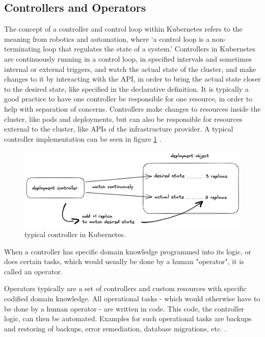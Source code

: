 \subsection*{Controllers and Operators}
The concept of a controller and control loop within Kubernetes refers to the
meaning from robotics and automation, where
\enquote*{a control loop is a non-terminating loop that regulates the state of a system.}
\autocite{controllersKubernetes}
Controllers in Kubernetes are continuously running in a control loop,
in specified intervals and sometimes internal or external triggers, 
and watch the actual state of the cluster,
and make changes to it by interacting with the API,
in order to bring the actual state closer to the desired state,
like specified in the declarative definition.
It is typically a good practice to have one controller
be responsible for one resource, 
in order to help with separation of concerns.
Controllers make changes to resources inside the cluster,
like pods and deployments,
but can also be responsible for resources external to the cluster,
like APIs of the infrastructure provider.
A typical controller implementation can be seen in figure \ref{fig:typicalControllerKubernetes}
\autocite{controllersKubernetes}.

\begin{figure}[h]
	\centering
	\includegraphics[width=1.00\linewidth]{assets/typical-controller.png}
	\caption{typical controller in Kubernetes.
	}
	\label{fig:typicalControllerKubernetes}	
\end{figure}

When a controller has specific domain knowledge programmed into its logic,
or does certain tasks, which would usually be done by a human "operator",
it is called an operator.

Operators typically are a set of controllers and custom resources
with specific codified domain knowledge.
All operational tasks -
which would otherwise have to be done by a human operator -
are written in code.
This code, the controller logic, can then be automated.
Examples for such operational tasks are
backups and restoring of backups, error remediation, database migrations, etc.
\autocite{operatorWhitepaperV1}.

